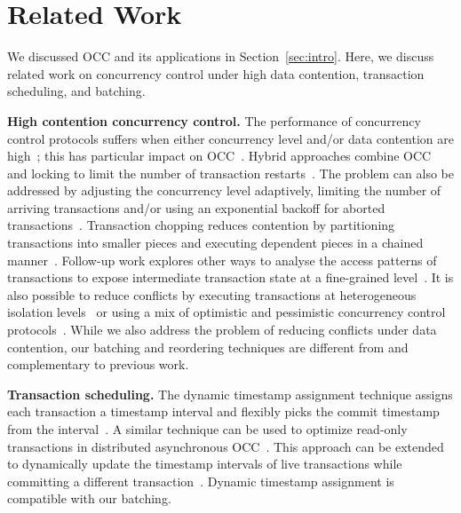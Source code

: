 \section{Related Work}\label{sec:relwork}

We discussed OCC and its applications in Section~\ref{sec:intro}. 
Here, we discuss related work on concurrency control under high data contention, transaction scheduling, and batching. 

{\bf High contention concurrency control.}
The performance of concurrency control protocols suffers when either concurrency level and/or data contention are high~\cite{franaszek1985limitations}; this has particular impact on OCC~\cite{agrawal1987concurrency}. Hybrid approaches combine OCC and locking to limit the number of transaction restarts~\cite{thomasian1998distributed,yu1992analysis}. The problem can also be addressed by adjusting the concurrency level adaptively, limiting the number of arriving transactions and/or using an exponential backoff for aborted transactions~\cite{helal1993adaptive}. Transaction chopping reduces contention by partitioning transactions into smaller pieces and executing dependent pieces in a chained manner~\cite{mu2014extracting,shasha1995transaction,xie2015high}. Follow-up work explores other ways to analyse the access patterns of transactions to expose intermediate transaction state at a fine-grained level~\cite{wang2016scaling}. It is also possible to reduce conflicts by executing transactions at heterogeneous isolation levels~\cite{xie2014salt,xie2015high} or using a mix of optimistic and pessimistic concurrency control protocols~\cite{wang2016mostly}. While we also address the problem of reducing conflicts under data contention, our batching and reordering techniques are different from and complementary to previous work.

{\bf Transaction scheduling.}
The dynamic timestamp assignment technique assigns each transaction a timestamp interval and flexibly picks the commit timestamp from the interval~\cite{bayer1982dynamic}. A similar technique can be used to optimize read-only transactions in distributed asynchronous OCC~\cite{ding2015centiman}. This approach can be extended to dynamically update the timestamp intervals of live transactions while committing a different transaction~\cite{boksenbaum1987concurrent}. Dynamic timestamp assignment is compatible with our batching.

